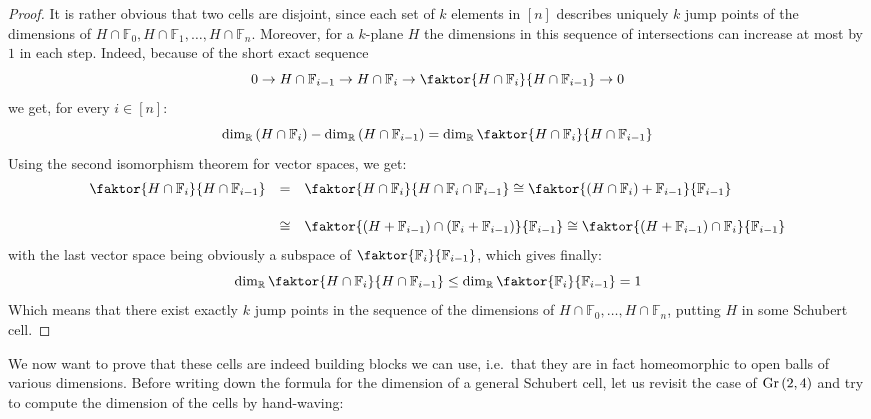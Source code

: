 \begin{proof} It is rather obvious that two cells are disjoint, since each set of $k$ elements in $[n]$ describes uniquely $k$ jump points of the dimensions of $H\cap\mathbb{F}_0,H\cap\mathbb{F}_1,\ldots,H\cap\mathbb{F}_n$. Moreover, for a $k$-plane $H$ the dimensions in this sequence of intersections can increase at most by $1$ in each step. Indeed, because of the short exact sequence
\[0\to H\cap\mathbb{F}_{i-1}\to H\cap\mathbb{F}_i\to\faktor{H\cap\mathbb{F}_i}{H\cap\mathbb{F}_{i-1}}\to0\]
we get, for every $i\in[n]$:
\[\dim_{\mathbb{R}}\left(H\cap\mathbb{F}_i\right)-\dim_{\mathbb{R}}\left(H\cap\mathbb{F}_{i-1}\right)=\dim_{\mathbb{R}}\faktor{H\cap\mathbb{F}_i}{H\cap\mathbb{F}_{i-1}}\]
Using the second isomorphism theorem for vector spaces, we get:
\[\begin{array}{>{\displaystyle}r>{\displaystyle}c>{\displaystyle}l}\faktor{H\cap\mathbb{F}_i}{H\cap\mathbb{F}_{i-1}}
&=&\faktor{H\cap\mathbb{F}_i}{H\cap\mathbb{F}_i\cap\mathbb{F}_{i-1}}\cong\faktor{(H\cap\mathbb{F}_i)+\mathbb{F}_{i-1}}{\mathbb{F}_{i-1}}\\[1.5em]
&\cong&\faktor{(H+\mathbb{F}_{i-1})\cap(\mathbb{F}_i+\mathbb{F}_{i-1})}{\mathbb{F}_{i-1}}\cong\faktor{(H+\mathbb{F}_{i-1})\cap\mathbb{F}_i}{\mathbb{F}_{i-1}}\\
\end{array}\]
with the last vector space being obviously a subspace of $\faktor{\mathbb{F}_i}{\mathbb{F}_{i-1}}$, which gives finally:
\[\dim_{\mathbb{R}}\faktor{H\cap\mathbb{F}_i}{H\cap\mathbb{F}_{i-1}}\leq\dim_{\mathbb{R}}\faktor{\mathbb{F}_i}{\mathbb{F}_{i-1}}=1\]
Which means that there exist exactly $k$ jump points in the sequence of the dimensions of $H\cap\mathbb{F}_0,\ldots,H\cap\mathbb{F}_n$, putting $H$ in some Schubert cell.
\end{proof}

We now want to prove that these cells are indeed building blocks we can use, i.e.\ that they are in fact homeomorphic to open balls of various dimensions. Before writing down the formula for the dimension of a general Schubert cell, let us revisit the case of $\Gr{2}{4}$ and try to compute the dimension of the cells by hand-waving:

